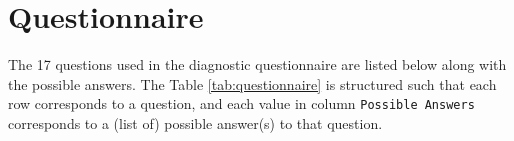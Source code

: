 \section{Questionnaire}
\label{appendix:questionnaire}
The 17 questions used in the diagnostic questionnaire are listed below along with the possible answers. The Table \ref{tab:questionnaire} is structured such that each row corresponds to a question, and each value in column \texttt{Possible Answers} corresponds to a (list of) possible answer(s) to that question.
\begin{table}[htbp]
    \centering
\end{table}

